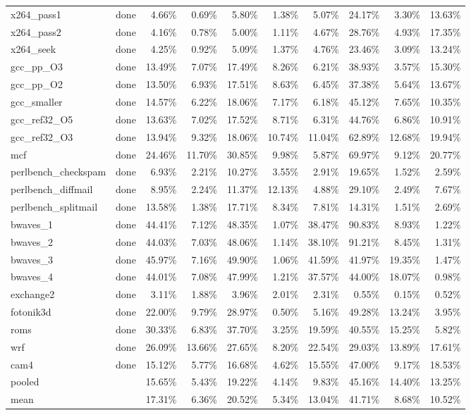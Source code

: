\documentclass[10pt,a4paper,landscape]{article}
\begin{document}
{\begin{longtable}{llrrrrrrrr}
x264\_pass1 & done & 4.66\% & 0.69\% & 5.80\% & 1.38\% & 5.07\% & 24.17\% & 3.30\% & 13.63\% \\
x264\_pass2 & done & 4.16\% & 0.78\% & 5.00\% & 1.11\% & 4.67\% & 28.76\% & 4.93\% & 17.35\% \\
x264\_seek & done & 4.25\% & 0.92\% & 5.09\% & 1.37\% & 4.76\% & 23.46\% & 3.09\% & 13.24\% \\
gcc\_pp\_O3 & done & 13.49\% & 7.07\% & 17.49\% & 8.26\% & 6.21\% & 38.93\% & 3.57\% & 15.30\% \\
gcc\_pp\_O2 & done & 13.50\% & 6.93\% & 17.51\% & 8.63\% & 6.45\% & 37.38\% & 5.64\% & 13.67\% \\
gcc\_smaller & done & 14.57\% & 6.22\% & 18.06\% & 7.17\% & 6.18\% & 45.12\% & 7.65\% & 10.35\% \\
gcc\_ref32\_O5 & done & 13.63\% & 7.02\% & 17.52\% & 8.71\% & 6.31\% & 44.76\% & 6.86\% & 10.91\% \\
gcc\_ref32\_O3 & done & 13.94\% & 9.32\% & 18.06\% & 10.74\% & 11.04\% & 62.89\% & 12.68\% & 19.94\% \\
mcf & done & 24.46\% & 11.70\% & 30.85\% & 9.98\% & 5.87\% & 69.97\% & 9.12\% & 20.77\% \\
perlbench\_checkspam & done & 6.93\% & 2.21\% & 10.27\% & 3.55\% & 2.91\% & 19.65\% & 1.52\% & 2.59\% \\
perlbench\_diffmail & done & 8.95\% & 2.24\% & 11.37\% & 12.13\% & 4.88\% & 29.10\% & 2.49\% & 7.67\% \\
perlbench\_splitmail & done & 13.58\% & 1.38\% & 17.71\% & 8.34\% & 7.81\% & 14.31\% & 1.51\% & 2.69\% \\
bwaves\_1 & done & 44.41\% & 7.12\% & 48.35\% & 1.07\% & 38.47\% & 90.83\% & 8.93\% & 1.22\% \\
bwaves\_2 & done & 44.03\% & 7.03\% & 48.06\% & 1.14\% & 38.10\% & 91.21\% & 8.45\% & 1.31\% \\
bwaves\_3 & done & 45.97\% & 7.16\% & 49.90\% & 1.06\% & 41.59\% & 41.97\% & 19.35\% & 1.47\% \\
bwaves\_4 & done & 44.01\% & 7.08\% & 47.99\% & 1.21\% & 37.57\% & 44.00\% & 18.07\% & 0.98\% \\
exchange2 & done & 3.11\% & 1.88\% & 3.96\% & 2.01\% & 2.31\% & 0.55\% & 0.15\% & 0.52\% \\
fotonik3d & done & 22.00\% & 9.79\% & 28.97\% & 0.50\% & 5.16\% & 49.28\% & 13.24\% & 3.95\% \\
roms & done & 30.33\% & 6.83\% & 37.70\% & 3.25\% & 19.59\% & 40.55\% & 15.25\% & 5.82\% \\
wrf & done & 26.09\% & 13.66\% & 27.65\% & 8.20\% & 22.54\% & 29.03\% & 13.89\% & 17.61\% \\
cam4 & done & 15.12\% & 5.77\% & 16.68\% & 4.62\% & 15.55\% & 47.00\% & 9.17\% & 18.53\% \\
\midrule
pooled &  & 15.65\% & 5.43\% & 19.22\% & 4.14\% & 9.83\% & 45.16\% & 14.40\% & 13.25\% \\
mean &  & 17.31\% & 6.36\% & 20.52\% & 5.34\% & 13.04\% & 41.71\% & 8.68\% & 10.52\% \\
\end{longtable}
}
\clearpage
\end{document}
